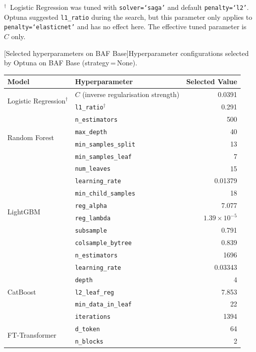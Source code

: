 {\small\noindent $^\dagger$~Logistic Regression was tuned with \texttt{solver=`saga'} and default \texttt{penalty=`l2'}. Optuna suggested \texttt{l1\_ratio} during the search, but this parameter only applies to \texttt{penalty=`elasticnet'} and has no effect here. The effective tuned parameter is $C$ only.}

\par\medskip\noindent\begin{minipage}{\linewidth}\centering
\small
{}[Selected hyperparameters on BAF Base]{Hyperparameter configurations selected by Optuna on BAF Base (strategy\,=\,None).}
\label{tab:hyperparams_baf}
\begin{tabular}{l l r}
\toprule
Model & Hyperparameter & Selected Value \\
\midrule
\multirow{2}{*}{Logistic Regression$^\dagger$}
  & $C$ (inverse regularisation strength) & 0.0391 \\
  & \texttt{l1\_ratio}$^\dagger$ & 0.291 \\
\midrule
\multirow{4}{*}{Random Forest}
  & \texttt{n\_estimators} & 500 \\
  & \texttt{max\_depth} & 40 \\
  & \texttt{min\_samples\_split} & 13 \\
  & \texttt{min\_samples\_leaf} & 7 \\
\midrule
\multirow{8}{*}{LightGBM}
  & \texttt{num\_leaves} & 15 \\
  & \texttt{learning\_rate} & 0.01379 \\
  & \texttt{min\_child\_samples} & 18 \\
  & \texttt{reg\_alpha} & 7.077 \\
  & \texttt{reg\_lambda} & $1.39 \times 10^{-5}$ \\
  & \texttt{subsample} & 0.791 \\
  & \texttt{colsample\_bytree} & 0.839 \\
  & \texttt{n\_estimators} & 1696 \\
\midrule
\multirow{5}{*}{CatBoost}
  & \texttt{learning\_rate} & 0.03343 \\
  & \texttt{depth} & 4 \\
  & \texttt{l2\_leaf\_reg} & 7.853 \\
  & \texttt{min\_data\_in\_leaf} & 22 \\
  & \texttt{iterations} & 1394 \\
\midrule
\multirow{10}{*}{FT-Transformer}
  & \texttt{d\_token} & 64 \\
  & \texttt{n\_blocks} & 2 \\

\end{tabular}
\end{minipage}
